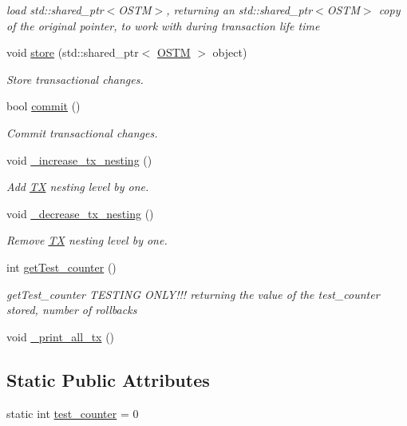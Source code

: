 \begin{DoxyCompactItemize}
\begin{DoxyCompactList}\small\item\em load std\+::shared\+\_\+ptr$<$\+O\+S\+T\+M$>$, returning an std\+::shared\+\_\+ptr$<$\+O\+S\+T\+M$>$ copy of the original pointer, to work with during transaction life time \end{DoxyCompactList}\item 
void \hyperlink{class_t_x_a7dbcb369aa4a3370b6c6829d278ece5d}{store} (std\+::shared\+\_\+ptr$<$ \hyperlink{class_o_s_t_m}{O\+S\+TM} $>$ object)
\begin{DoxyCompactList}\small\item\em Store transactional changes. \end{DoxyCompactList}\item 
bool \hyperlink{class_t_x_a9dde5d356b35e557448e58d260087356}{commit} ()
\begin{DoxyCompactList}\small\item\em Commit transactional changes. \end{DoxyCompactList}\item 
void \hyperlink{class_t_x_a1384bdf12d795854b5d32e7f61ffbdb8}{\+\_\+increase\+\_\+tx\+\_\+nesting} ()
\begin{DoxyCompactList}\small\item\em Add \hyperlink{class_t_x}{TX} nesting level by one. \end{DoxyCompactList}\item 
void \hyperlink{class_t_x_aa3ac499f576326588628ade96b27b4b1}{\+\_\+decrease\+\_\+tx\+\_\+nesting} ()
\begin{DoxyCompactList}\small\item\em Remove \hyperlink{class_t_x}{TX} nesting level by one. \end{DoxyCompactList}\item 
int \hyperlink{class_t_x_ae9bf97930c4670f59d334b345353a71e}{get\+Test\+\_\+counter} ()
\begin{DoxyCompactList}\small\item\em get\+Test\+\_\+counter T\+E\+S\+T\+I\+NG O\+N\+L\+Y!!! returning the value of the test\+\_\+counter stored, number of rollbacks \end{DoxyCompactList}\item 
void \hyperlink{class_t_x_a3d96ed91eb9ec73e16589f705661c5a7}{\+\_\+print\+\_\+all\+\_\+tx} ()
\end{DoxyCompactItemize}
\subsection*{Static Public Attributes}
\begin{DoxyCompactItemize}
\item 
static int \hyperlink{class_t_x_a25838234aab99ae891a90eb8623a8b3c}{test\+\_\+counter} = 0
\end{DoxyCompactItemize}
